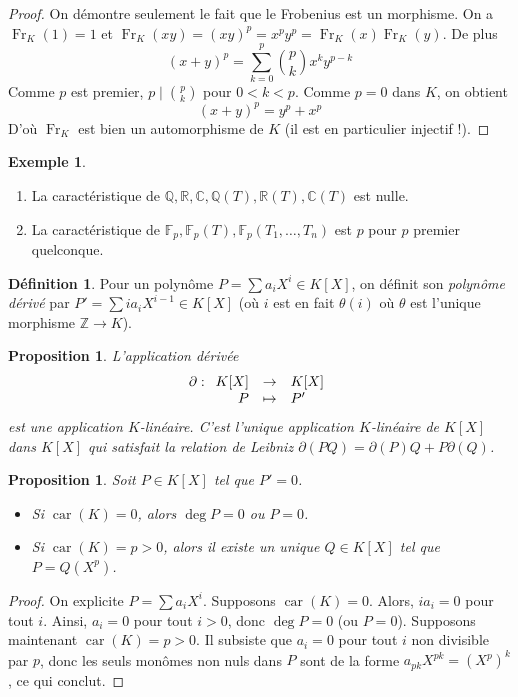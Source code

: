\documentclass{article}
\newcommand{\Z}{\mathbb{Z}}
\newcommand{\Q}{\mathbb{Q}}
\newcommand{\R}{\mathbb{R}}
\newcommand{\C}{\mathbb{C}}
\newcommand{\F}{\mathbb{F}}
\DeclareMathOperator{\car}{car}
\DeclareMathOperator{\Fr}{Fr}
\newcommand{\applic}[4]{\begin{array}[t]{rcl}
#1 & \to & #2 \\
#3 & \mapsto & #4
\end{array}}
\theoremstyle{plain}
\newtheorem{proposition}[theorem]{Proposition}
\theoremstyle{definition}
\newtheorem{definition}[theorem]{Définition}
\newtheorem{example}[theorem]{Exemple}
\theoremstyle{remark}
\begin{document}
\begin{proof}
    On démontre seulement le fait que le Frobenius est un morphisme.
    On a $\Fr_K(1) =1$ et $\Fr_K(xy) = (xy)^p = x^p y^p = \Fr_K(x) \Fr_K(y)$. De plus
    \[(x+y)^p = \sum_{k=0}^p \binom{p}{k} x^k y^{p-k}\]
    Comme $p$ est premier, $p \mid \binom{p}{k}$ pour $0 < k < p$. Comme \og $p = 0$ \fg dans $K$, on obtient
    \[(x+y)^p = y^p + x^p\]
    D'où $\Fr_K$ est bien un automorphisme de $K$ (il est en particulier injectif !).
\end{proof}

\begin{example} \leavevmode
    \begin{enumerate}
        \item La caractéristique de $\Q,\R,\C, \Q(T),\R(T),\C(T)$ est nulle.
        \item La caractéristique de $\F_p,\F_p(T), \F_p(T_1,\dots,T_n)$ est $p$ pour $p$ premier quelconque.
    \end{enumerate}
\end{example}

\begin{definition}
    Pour un polynôme $P = \sum a_i X^i \in K[X]$, on définit son \emph{polynôme dérivé} par $P' = \sum i a_i X^{i-1} \in K[X]$ (où $i$ est en fait $\theta(i)$ où $\theta$ est l'unique morphisme $\Z \to K$).
\end{definition}

\begin{proposition}
    L'application dérivée
    \[\partial : \applic{K[X]}{K[X]}{P}{P'}\]
    est une application $K$-linéaire. C'est l'unique application $K$-linéaire de $K[X]$ dans $K[X]$ qui satisfait la relation de Leibniz $\partial(PQ) = \partial(P) Q + P \partial(Q)$.
\end{proposition}

\begin{proposition}
    Soit $P \in K[X]$ tel que $P' = 0$.
    \begin{itemize}
        \item Si $\car(K) = 0$, alors $\deg P = 0$ ou $P = 0$.
        \item Si $\car(K) = p > 0$, alors il existe un unique $Q \in K[X]$ tel que $P = Q(X^p)$.
    \end{itemize}
\end{proposition}

\begin{proof}
    On explicite $P = \sum a_i X^i$. Supposons $\car (K) = 0$. Alors, $ia_i = 0$ pour tout $i$. Ainsi, $a_i = 0$ pour tout $i > 0$, donc $\deg P = 0$ (ou $P = 0$). Supposons maintenant $\car(K) = p > 0$. Il subsiste que $a_i = 0$ pour tout $i$ non divisible par $p$, donc les seuls monômes non nuls dans $P$ sont de la forme $a_{pk} X^{pk} = (X^p)^k$, ce qui conclut.
\end{proof}
\end{document}
